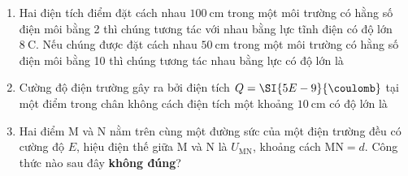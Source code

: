 \begin{enumerate}[label=\bfseries Câu \arabic*:]
\item Hai điện tích điểm đặt cách nhau $\SI{100}{\centi\meter}$  trong một môi trường có hằng số điện môi bằng 2 thì chúng tương tác với nhau bằng lực tĩnh điện có độ lớn $\SI{8}{\coulomb}$.  Nếu chúng được đặt cách nhau $\SI{50}{\centi\meter}$  trong một môi trường có hằng số điện môi bằng 10 thì chúng tương tác nhau bằng lực có độ lớn là

\item Cường độ điện trường gây ra bởi điện tích $Q=\SI{5E-9}{\coulomb}$  tại một điểm trong chân không cách điện tích một khoảng $\SI{10}{\centi\meter}$  có độ lớn là

\item Hai điểm M và N nằm trên cùng một đường sức của một điện trường đều có cường độ $E$, hiệu điện thế giữa M và N là $U_\text{MN}$, khoảng cách $\text{MN}=d$. Công thức nào sau đây \textbf{không đúng}?


\end{enumerate}
